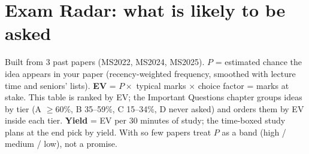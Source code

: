 \chapter{Exam Radar: what is likely to be asked}
\label{ch:radar}
Built from 3 past papers (MS2022, MS2024, MS2025). $P$ = estimated chance the idea appears in your paper (recency-weighted frequency, smoothed with lecture time and seniors' lists). \textbf{EV} = $P\times$ typical marks $\times$ choice factor = marks at stake. This table is ranked by EV; the Important Questions chapter groups ideas by tier (A $\ge$60\%, B 35--59\%, C 15--34\%, D never asked) and orders them by EV inside each tier. \textbf{Yield} = EV per 30 minutes of study; the time-boxed study plans at the end pick by yield. With so few papers treat $P$ as a band (high / medium / low), not a promise.


